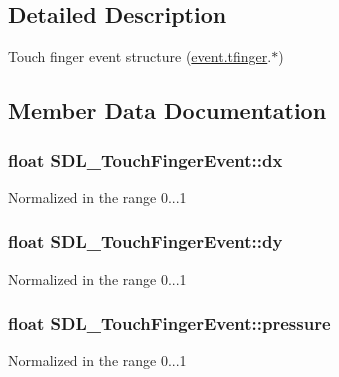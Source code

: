 \subsection{Detailed Description}
Touch finger event structure (\hyperlink{union_s_d_l___event_ab18d7d60794cb056948ffa58541bc3c5}{event.\+tfinger}.$\ast$) 

\subsection{Member Data Documentation}
\hypertarget{struct_s_d_l___touch_finger_event_ac6acac209d6e2bd659fdb6760081393d}{}
\subsubsection[{dx}]{\setlength{\rightskip}{0pt plus 5cm}float S\+D\+L\+\_\+\+Touch\+Finger\+Event\+::dx}\label{struct_s_d_l___touch_finger_event_ac6acac209d6e2bd659fdb6760081393d}
Normalized in the range 0...1 \hypertarget{struct_s_d_l___touch_finger_event_a9c0320c5f18a6b9d10da657e166608c9}{}
\subsubsection[{dy}]{\setlength{\rightskip}{0pt plus 5cm}float S\+D\+L\+\_\+\+Touch\+Finger\+Event\+::dy}\label{struct_s_d_l___touch_finger_event_a9c0320c5f18a6b9d10da657e166608c9}
Normalized in the range 0...1 \hypertarget{struct_s_d_l___touch_finger_event_ab4fca822d0807b5748dbae8d3cc56524}{}
\subsubsection[{pressure}]{\setlength{\rightskip}{0pt plus 5cm}float S\+D\+L\+\_\+\+Touch\+Finger\+Event\+::pressure}\label{struct_s_d_l___touch_finger_event_ab4fca822d0807b5748dbae8d3cc56524}
Normalized in the range 0...1 \hypertarget{struct_s_d_l___touch_finger_event_ad7a6f39ec9af1bf47b160d18314edd70}{}
